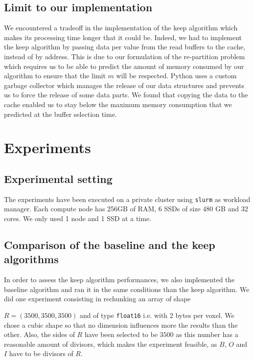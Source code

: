 \documentclass[conference]{IEEEtran}
\begin{document}
\subsection{Limit to our implementation}
We encountered a tradeoff in the implementation of the keep algorithm which
makes its processing time longer that it could be.
Indeed, we had to implement the keep algorithm by passing data per value from
the read buffers to the cache, instead of by address.
This is due to our formulation of the re-partition problem which requires us to
be able to predict the amount of memory consumed by our algorithm to ensure that
the limit $m$ will be respected.
Python uses a custom garbage collector which manages the release of our
data structures and prevents us to force the release of some data parts.
We found that copying the data to the cache enabled us to stay below the
maximum memory consumption that we predicted at the buffer selection time.

\section{Experiments}

\subsection{Experimental setting}
The experiments have been executed on a private
cluster using \texttt{slurm} as workload manager. Each compute node has 256GB of
RAM, 6 SSDs of size 480 GB and 32 cores. We only used 1 node and 1 SSD at a
time.

\subsection{Comparison of the baseline and the keep algorithms}
In order to assess the keep algorithm performances, we also implemented the
baseline algorithm and ran it in the same conditions than the keep algorithm.
We did one experiment consisting in rechunking an array of shape

$R=(3500,3500,3500)$ and of type \texttt{float16} i.e. with 2 bytes per voxel.
We chose a cubic shape so that no dimension influences more the results than
the other.
Also, the sides of $R$ have been selected to be $3500$ as this number has a
reasonable amount of divisors, which makes the experiment feasible, as
$B$, $O$ and $I$ have to be divisors of $R$.
\end{document}
